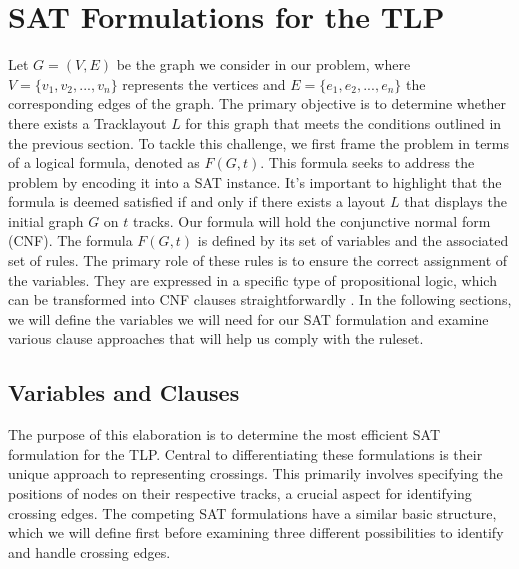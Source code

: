 \documentclass[bachelor, english]{algothesis}
\begin{document}
\chapter{SAT Formulations for the TLP} 
\label{chap:Formulation_of_tlp}
Let $G = (V,E)$ be the graph we consider in our problem, where $V =\{v_1,v_2,...,v_n\}$ represents the vertices and $E = \{e_1,e_2,...,e_n\}$ the corresponding edges of the graph. The primary objective is to determine whether there exists a Tracklayout $L$ for this graph that meets the conditions outlined in the previous section. To tackle this challenge, we first frame the problem in terms of a logical formula, denoted as $F(G, t)$. This formula seeks to address the problem by encoding it into a SAT instance. It's important to highlight that the formula is deemed satisfied if and only if there exists a layout $L$ that displays the initial graph $G$ on $t$ tracks. Our formula will hold the conjunctive normal form (CNF). The formula $F(G, t)$ is defined by its set of variables and the associated set of rules. The primary role of these rules is to ensure the correct assignment of the variables. They are expressed in a specific type of propositional logic, which can be transformed into CNF clauses straightforwardly \cite{conjunction}. In the following sections, we will define the variables we will need for our SAT formulation and examine various clause approaches that will help us comply with the ruleset.

\section{Variables and Clauses}
\label{sec:vars_clauses}
The purpose of this elaboration is to determine the most efficient SAT formulation for the TLP. Central to differentiating these formulations is their unique approach to representing crossings. This primarily involves specifying the positions of nodes on their respective tracks, a crucial aspect for identifying crossing edges. The competing SAT formulations have a similar basic structure, which we will define first before examining three different possibilities to identify and handle crossing edges.
\newline

\label{sec:basic_clauses}
\end{document}
